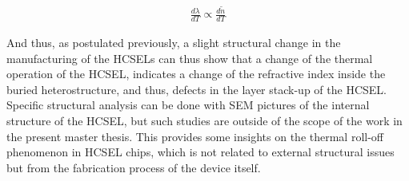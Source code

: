 \begin{align}
 \frac{d \lambda}{d T} \propto \frac{d \tilde n}{dT}
\end{align}

And thus, as postulated previously, a slight structural change in the manufacturing of the HCSELs can thus show that a change of the thermal operation of the HCSEL, indicates a change of the refractive index inside the buried heterostructure, and thus, defects in the layer stack-up of the HCSEL. Specific structural analysis can be done with SEM pictures of the internal structure of the HCSEL, but such studies are outside of the scope of the work in the present master thesis. This provides some insights on the thermal roll-off phenomenon in HCSEL chips, which is not related to external structural issues but from the fabrication process of the device itself.